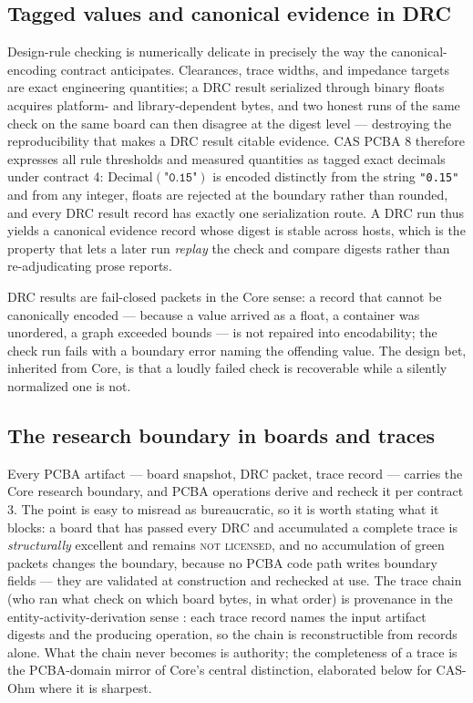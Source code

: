 \subsection{Tagged values and canonical evidence in DRC}\label{integ:pcba:drc}

Design-rule checking is numerically delicate in precisely the way the canonical-encoding contract anticipates. Clearances, trace widths, and impedance targets are exact engineering quantities; a DRC result serialized through binary floats acquires platform- and library-dependent bytes, and two honest runs of the same check on the same board can then disagree at the digest level --- destroying the reproducibility that makes a DRC result citable evidence. CAS PCBA 8 therefore expresses all rule thresholds and measured quantities as tagged exact decimals under contract 4: $\mathrm{Decimal}(\texttt{"0.15"})$ is encoded distinctly from the string \texttt{"0.15"} and from any integer, floats are rejected at the boundary rather than rounded, and every DRC result record has exactly one serialization route. A DRC run thus yields a canonical evidence record whose digest is stable across hosts, which is the property that lets a later run \emph{replay} the check and compare digests rather than re-adjudicating prose reports.

DRC results are fail-closed packets in the Core sense: a record that cannot be canonically encoded --- because a value arrived as a float, a container was unordered, a graph exceeded bounds --- is not repaired into encodability; the check run fails with a boundary error naming the offending value. The design bet, inherited from Core, is that a loudly failed check is recoverable while a silently normalized one is not.

\subsection{The research boundary in boards and traces}\label{integ:pcba:boundary}

Every PCBA artifact --- board snapshot, DRC packet, trace record --- carries the Core research boundary, and PCBA operations derive and recheck it per contract 3. The point is easy to misread as bureaucratic, so it is worth stating what it blocks: a board that has passed every DRC and accumulated a complete trace is \emph{structurally} excellent and remains \textsc{not licensed}, and no accumulation of green packets changes the boundary, because no PCBA code path writes boundary fields --- they are validated at construction and rechecked at use. The trace chain (who ran what check on which board bytes, in what order) is provenance in the entity-activity-derivation sense \cite{prov}: each trace record names the input artifact digests and the producing operation, so the chain is reconstructible from records alone. What the chain never becomes is authority; the completeness of a trace is the PCBA-domain mirror of Core's central distinction, elaborated below for CAS-Ohm where it is sharpest.

